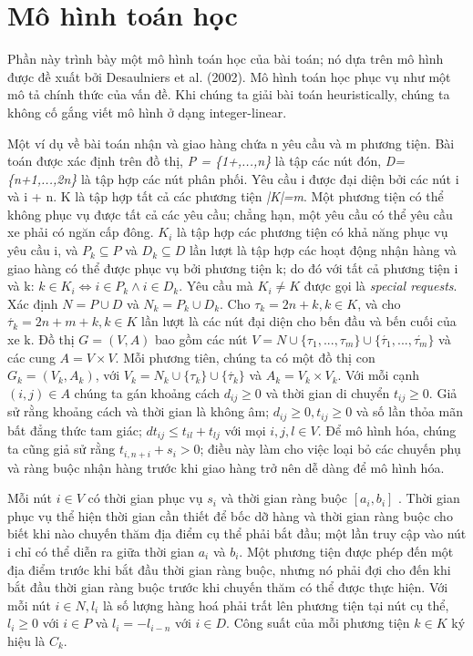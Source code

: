 \chapter{Mô hình toán học}
Phần này trình bày một mô hình toán học của bài toán; nó dựa trên mô hình được đề xuất bởi Desaulniers et al. (2002). Mô hình toán học phục vụ như một mô tả chính thức của vấn đề. Khi chúng ta giải bài toán heuristically, chúng ta không cố gắng viết mô hình ở dạng integer-linear.

Một ví dụ về bài toán nhận và giao hàng chứa n yêu cầu và m phương tiện. Bài toán được xác định trên đồ thị, \textit{P = \{1+,...,n\}} là tập các nút đón, \textit{D=\{n+1,...,2n\}} là tập hợp các nút phân phối. Yêu cầu i được đại diện bởi các nút i và i + n. K là tập hợp tất cả các phương tiện \textit{|K|=m}. Một phương tiện có thể không phục vụ được tất cả các yêu cầu; chẳng hạn, một yêu cầu có thể yêu cầu xe phải có ngăn cấp đông.
$K_i$ là tập hợp các phương tiện có khả năng phục vụ yêu cầu i, và $P_k \subseteq P$ và $D_k \subseteq D$ lần lượt là tập hợp các hoạt động nhận hàng và giao hàng có thể được phục vụ bởi phương tiện k; do đó với tất cả phương tiện i và k: $k \in K_i \Leftrightarrow i \in P_k \land i \in D_k $. Yêu cầu mà $K_i \ne K$ được gọi là \textit{special requests}. Xác định $N = P \cup D$ và $N_k = P_k \cup D_k$. Cho $\tau_k = 2n +k, k \in K$, và cho $\acute{\tau_k} = 2n + m +k, k \in K$ lần lượt là các nút đại diện cho bến đầu và bến cuối của xe k. 
Đồ thị $G = (V,A)$ bao gồm các nút $V= N \cup \{ \tau_1,...,\tau_m\} \cup \{\acute{\tau_1},...,\acute{\tau_m}\}$ và các cung $A = V \times V$. Mỗi phương tiên, chúng ta có một đồ thị con $G_k = (V_k, A_k)$, với $V_k = N_k \cup \{\tau_k\} \cup \{\acute{\tau_k}\}$ và $A_k =V_k \times V_k$. Với mỗi cạnh $(i, j) \in A$ chúng ta gán khoảng cách $d_{ij} \geq 0$ và thời gian di chuyển $t_{ij} \geq 0$. Giả sử rằng khoảng cách và thời gian là không âm; $d_{ij} \geq 0, t_{ij} \geq 0$ và số lần thỏa mãn bất đẳng thức tam giác; $dt_{ij} \leq t_{il} + t_{lj}$ với mọi $i, j, l \in V$.
Để mô hình hóa, chúng ta cũng giả sử rằng $t_{i,n+i} + s_i > 0$; điều này làm cho việc loại bỏ các chuyến phụ và ràng buộc nhận hàng trước khi giao hàng trở nên dễ dàng để mô hình hóa.

Mỗi nút $i \in V$ có thời gian phục vụ $s_i$ và thời gian ràng buộc $[a_i, b_i]$ . Thời gian phục vụ thể hiện thời gian cần thiết để bốc dỡ hàng và thời gian ràng buộc cho biết khi nào chuyến thăm địa điểm cụ thể phải bắt đầu; một lần truy cập vào nút i chỉ có thể diễn ra giữa thời gian $a_i$ và $b_i$. Một phương tiện được phép đến một địa điểm trước khi bắt đầu thời gian ràng buộc, nhưng nó phải đợi cho đến khi bắt đầu thời gian ràng buộc trước khi chuyến thăm có thể được thực hiện. Với mỗi nút $i \in N, l_i$ là số lượng hàng hoá phải trất lên phương tiện tại nút cụ thể, $l_i \geq 0$ với $i \in P$ và $l_i = -l_{i-n}$ với $i \in D$. Công suất của mỗi phương tiện $k \in K$ ký hiệu là $C_k$.

